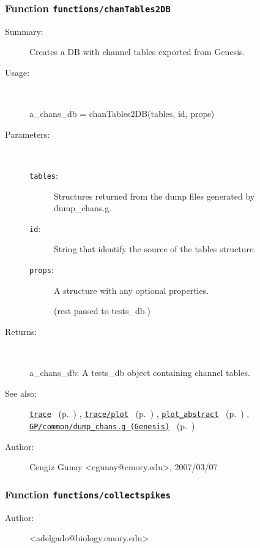 \subsubsection[Function \texttt{chanTables2DB}]{Function \texttt{functions/chanTables2DB}}%
%
\label{ref_functions__chanTables2DB}%
\hypertarget{ref_functions__chanTables2DB}{}%
\begin{description}
\item[Summary:]Creates a DB with channel tables exported from Genesis.
%
\item[Usage:]~%
\begin{lyxcode}%
a\_chans\_db = chanTables2DB(tables, id, props)
%
\end{lyxcode}%
%
%
\item[Parameters:]~
\begin{description}%
\item[\texttt{tables}:]
 Structures returned from the dump files generated by dump\_chans.g.
\item[\texttt{id}:]
 String that identify the source of the tables structure.
\item[\texttt{props}:]
 A structure with any optional properties.

(rest passed to tests\_db.)
\end{description}%
%
\item[Returns:
]~

	a\_chans\_db: A tests\_db object containing channel tables.
%
%
\item[See also:]%
\hyperlink{ref_trace}{\texttt{trace}}%
\ (p.~\pageref{ref_trace})%
%
, \hyperlink{ref_trace__plot}{\texttt{trace/plot}}%
\ (p.~\pageref{ref_trace__plot})%
%
, \hyperlink{ref_plot_abstract}{\texttt{plot\_abstract}}%
\ (p.~\pageref{ref_plot_abstract})%
%
, \hyperlink{ref_GP__common}{\texttt{GP/common/dump\_chans.g (Genesis)}}%
\ (p.~\pageref{ref_GP__common})%
%
%
\item[Author:]%
Cengiz Gunay <cgunay@emory.edu>, 2007/03/07
%
\end{description}
\methodline%
\subsubsection[Function \texttt{collectspikes}]{Function \texttt{functions/collectspikes}}%
%
\label{ref_functions__collectspikes}%
\hypertarget{ref_functions__collectspikes}{}%
\begin{description}
%
%
%
%
%
%
%
\item[Author:]%
<adelgado@biology.emory.edu>
%
\end{description}
\methodline%
